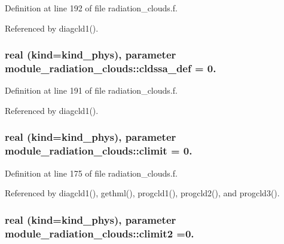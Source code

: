Definition at line 192 of file radiation\+\_\+clouds.\+f.



Referenced by diagcld1().

\subsubsection[{\texorpdfstring{cldssa\+\_\+def}{cldssa_def}}]{\setlength{\rightskip}{0pt plus 5cm}real (kind=kind\+\_\+phys), parameter module\+\_\+radiation\+\_\+clouds\+::cldssa\+\_\+def = 0.\hspace{0.3cm}{\ttfamily [private]}}\hypertarget{namespacemodule__radiation__clouds_a2ce850be46f0144caa09309ae01958c2}{}\label{namespacemodule__radiation__clouds_a2ce850be46f0144caa09309ae01958c2}


Definition at line 191 of file radiation\+\_\+clouds.\+f.



Referenced by diagcld1().

\subsubsection[{\texorpdfstring{climit}{climit}}]{\setlength{\rightskip}{0pt plus 5cm}real (kind=kind\+\_\+phys), parameter module\+\_\+radiation\+\_\+clouds\+::climit = 0.\hspace{0.3cm}{\ttfamily [private]}}\hypertarget{namespacemodule__radiation__clouds_ad4d5840310847f5bf39082114069ceb8}{}\label{namespacemodule__radiation__clouds_ad4d5840310847f5bf39082114069ceb8}


Definition at line 175 of file radiation\+\_\+clouds.\+f.



Referenced by diagcld1(), gethml(), progcld1(), progcld2(), and progcld3().

\subsubsection[{\texorpdfstring{climit2}{climit2}}]{\setlength{\rightskip}{0pt plus 5cm}real (kind=kind\+\_\+phys), parameter module\+\_\+radiation\+\_\+clouds\+::climit2 =0.\hspace{0.3cm}{\ttfamily [private]}}\hypertarget{namespacemodule__radiation__clouds_a2f6f333d39f496f623036802fc05f209}{}\label{namespacemodule__radiation__clouds_a2f6f333d39f496f623036802fc05f209}


